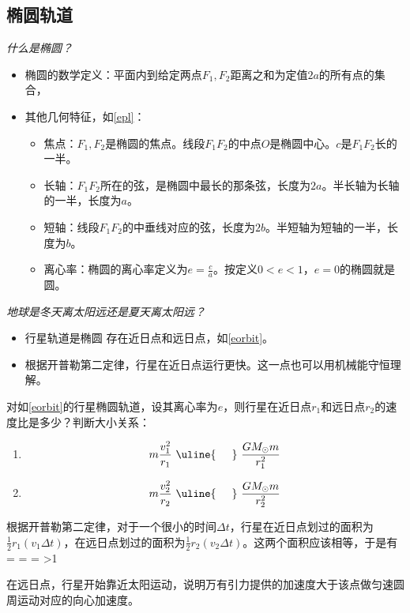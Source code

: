 \documentclass[a4paper,9pt]{ctexart}
\begin{document}
\subsection{椭圆轨道}
\emph{什么是椭圆？}
\begin{itemize}
\item
椭圆的数学定义：平面内到给定两点$F_1,F_2$距离之和为定值$2a$的所有点的集合，
\item
其他几何特征，如\cref{epl}：
\begin{itemize}
\item
焦点：$F_1,F_2$是椭圆的焦点。线段$F_1F_2$的中点$O$是椭圆中心。$c$是$F_1 F_2$长的一半。
\item
长轴：$F_1F_2$所在的弦，是椭圆中最长的那条弦，长度为$2a$。\so 半长轴为长轴的一半，长度为$a$。
\item
短轴：线段$F_1F_2$的中垂线对应的弦，长度为$2b$。\so 半短轴为短轴的一半，长度为$b$。
\item
离心率：椭圆的离心率定义为$e = \frac{c}{a}$。\so 按定义$0<e<1$，$e=0$的椭圆就是圆。
\end{itemize}
\end{itemize}
\emph{地球是冬天离太阳远还是夏天离太阳远？}
\begin{itemize}
\item
行星轨道是椭圆 \so 存在近日点和远日点，如\cref{eorbit}。
\item
根据开普勒第二定律，行星在近日点运行更快。这一点也可以用机械能守恒理解。
\end{itemize}
\begin{eg}
对如\cref{eorbit}的行星椭圆轨道，设其离心率为$e$，则行星在近日点$r_1$和远日点$r_2$的速度比是多少？判断大小关系：
\begin{enumerate}
\item
$$m\frac{v_1^2}{r_1} \ \uline{\hspace{0.5cm}} \ \frac{GM_\odot m}{r_1^2}$$
\item
$$m\frac{v_2^2}{r_2}\  \uline{\hspace{0.5cm}}\  \frac{GM_\odot m}{r_2^2}$$
\end{enumerate}
\end{eg}
\begin{ans}
根据开普勒第二定律，对于一个很小的时间$\Delta t$，行星在近日点划过的面积为$\frac{1}{2}r_1 (v_1 \Delta t)$，在远日点划过的面积为$\frac{1}{2}r_2 (v_2 \Delta t)$。这两个面积应该相等，于是有
\beq
{} =  =  =  >1
\eeq
\par
在远日点，行星开始靠近太阳运动，说明万有引力提供的加速度大于该点做匀速圆周运动对应的向心加速度。
\end{ans}
\end{document}

